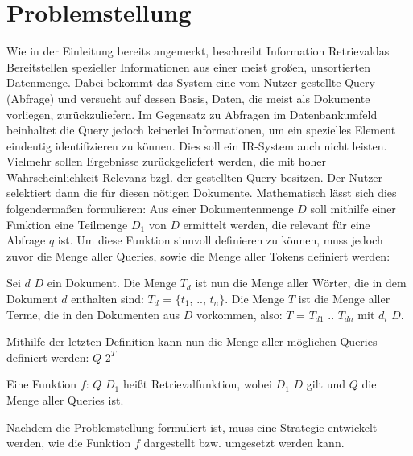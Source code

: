 \section{Problemstellung}
Wie in der Einleitung bereits angemerkt, beschreibt \glqq Information Retrieval\grqq das Bereitstellen spezieller Informationen aus einer meist großen, unsortierten Datenmenge. Dabei bekommt das System eine vom Nutzer gestellte Query (Abfrage) und versucht auf dessen Basis, Daten, die meist als Dokumente vorliegen, zurückzuliefern.
Im Gegensatz zu Abfragen im Datenbankumfeld beinhaltet die Query jedoch keinerlei Informationen, um ein spezielles Element eindeutig identifizieren zu können. Dies soll ein IR-System auch nicht leisten. Vielmehr sollen Ergebnisse zurückgeliefert werden, die mit hoher Wahrscheinlichkeit Relevanz bzgl. der gestellten Query besitzen. Der Nutzer selektiert dann die für diesen nötigen Dokumente.
\newline
Mathematisch lässt sich dies folgendermaßen formulieren:
Aus einer Dokumentenmenge $D$ soll mithilfe einer Funktion eine Teilmenge $D_1$ von $D$ ermittelt werden, die relevant für eine Abfrage $q$ ist.
\newline
Um diese Funktion sinnvoll definieren zu können, muss jedoch zuvor die Menge aller Queries, sowie die Menge aller Tokens definiert werden:
\begin{defi}
	Sei $d$ \in $D$ ein Dokument. Die Menge $T_d$ ist nun die Menge aller Wörter, die in dem Dokument $d$ enthalten sind: $T_d$ = $\{$$t_1$, .., $t_n$$\}$.
	\newline
	Die Menge $T$ ist die Menge aller Terme, die in den Dokumenten aus $D$ vorkommen, also:
	$T$ = $T_{d1}$ \cup .. \cup $T_{dn}$ mit $d_i$ \in $D$.
\end{defi}

\begin{defi}
	Mithilfe der letzten Definition kann nun die Menge aller möglichen Queries definiert werden:
	$Q$ \subseteq $2^T$
\end{defi}

\begin{defi}
	Eine Funktion $f$: $Q$ \rightarrow $D_1$ heißt Retrievalfunktion, wobei $D_1$ \subseteq $D$ gilt und $Q$ die Menge aller Queries ist.
\end{defi}

Nachdem die Problemstellung formuliert ist, muss eine Strategie entwickelt werden, wie die Funktion $f$ dargestellt bzw. umgesetzt werden kann.

\newpage

